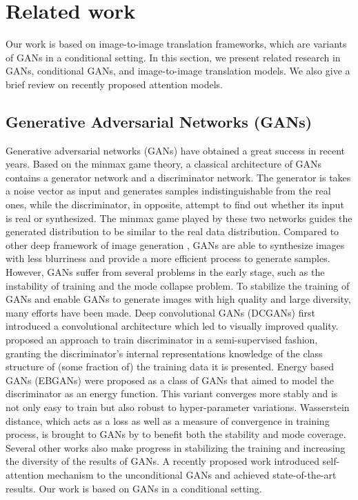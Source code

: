 \section{Related work}
\label{sec:related_work}
Our work is based on image-to-image translation frameworks, which are variants of GANs in a conditional setting. In this section, we present related research in GANs, conditional GANs, and image-to-image translation models. We also give a brief review on recently proposed attention models.
\subsection{Generative Adversarial Networks (GANs)}
Generative adversarial networks (GANs) \cite{GANs} have obtained a great success in recent years.
Based on the minmax game theory, a classical architecture of GANs contains a generator network and a discriminator network. The generator is takes a noise vector as input and generates samples indistinguishable from the real ones, while the discriminator, in opposite, attempt to find out whether its input is real or synthesized. The minmax game played by these two networks guides the generated distribution to be similar to the real data distribution. Compared to other deep  framework of image generation \cite{VAEs, PixelCNN}, GANs are able to synthesize images with less blurriness and provide a more efficient process to generate samples. However, GANs suffer from several problems in the early stage, such as the instability of training and the mode collapse problem. To stabilize the training of GANs and enable GANs to generate images with high quality and large diversity, many efforts have been made. Deep convolutional GANs (DCGANs) \cite{DCGANs} first introduced a convolutional architecture which led to visually improved quality. \cite{Improved_Techniques} proposed an approach to train discriminator in a semi-supervised fashion, granting the discriminator's internal representations knowledge of the class structure of (some fraction of) the training data it is presented. Energy based GANs (EBGANs) \cite{EBGANs}  were proposed as a class of GANs that aimed to model the discriminator as an energy function. This variant converges more stably and is not only easy to train but also robust to hyper-parameter variations. Wasserstein distance, which acts as a loss as well as a measure of convergence in training process, is brought to GANs by \cite{WGANs, WGAN-GP} to benefit both the stability and mode coverage. Several other works \cite{LSGANs, BEGANs, DRAGANs} also make progress in stabilizing the training and increasing the diversity of the results of GANs. A recently proposed work \cite{SAGANs} introduced self-attention mechanism to the unconditional GANs and achieved state-of-the-art results. Our work is based on GANs in a conditional setting.
%

